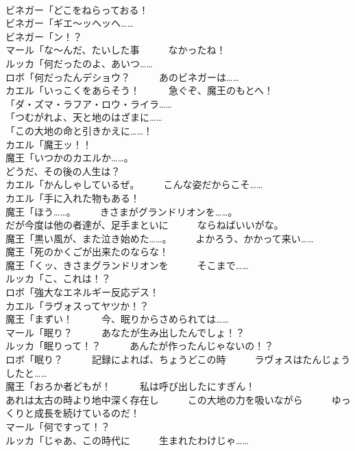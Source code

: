\documentclass[8pt]{extreport}
\begin{document}
\begin{CJK}{UTF8}{min}
\\	ビネガー「どこをねらっておる！	
\\	ビネガー「ギエ～ッヘッヘ……	
\\	ビネガー「ン！？	
\\	マール「な～んだ、たいした事　　　なかったね！	
\\	ルッカ「何だったのよ、あいつ……	
\\	ロボ「何だったんデショウ？　　　あのビネガーは……	
\\	カエル「いっこくをあらそう！　　　急ぐぞ、魔王のもとへ！	
\\	「ダ・ズマ・ラフア・ロウ・ライラ……	
\\	「つむがれよ、天と地のはざまに……	
\\	「この大地の命と引きかえに……！	
\\	カエル「魔王ッ！！	
\\	魔王「いつかのカエルか……。	
\\	どうだ、その後の人生は？	
\\	カエル「かんしゃしているぜ。　　　こんな姿だからこそ……	
\\	カエル「手に入れた物もある！	
\\	魔王「ほう……。　　　きさまがグランドリオンを……。	
\\	だが今度は他の者達が、足手まといに　　　ならねばいいがな。	
\\	魔王「黒い風が、また泣き始めた……。　　　よかろう、かかって来い……	
\\	魔王「死のかくごが出来たのならな！	
\\	魔王「くッ、きさまグランドリオンを　　　そこまで……	
\\	ルッカ「こ、これは！？	
\\	ロボ「強大なエネルギー反応デス！	
\\	カエル「ラヴォスってヤツか！？	
\\	魔王「まずい！　　　今、眠りからさめられては……	
\\	マール「眠り？　　　あなたが生み出したんでしょ！？	
\\	ルッカ「眠りって！？　　　あんたが作ったんじゃないの！？	
\\	ロボ「眠り？　　　記録によれば、ちょうどこの時　　　ラヴォスはたんじょうしたと……	
\\	魔王「おろか者どもが！　　　私は呼び出したにすぎん！	
\\	あれは太古の時より地中深く存在し　　　この大地の力を吸いながら　　　ゆっくりと成長を続けているのだ！	
\\	マール「何ですって！？	
\\	ルッカ「じゃあ、この時代に　　　生まれたわけじゃ……	

\end{CJK}
\end{document}
